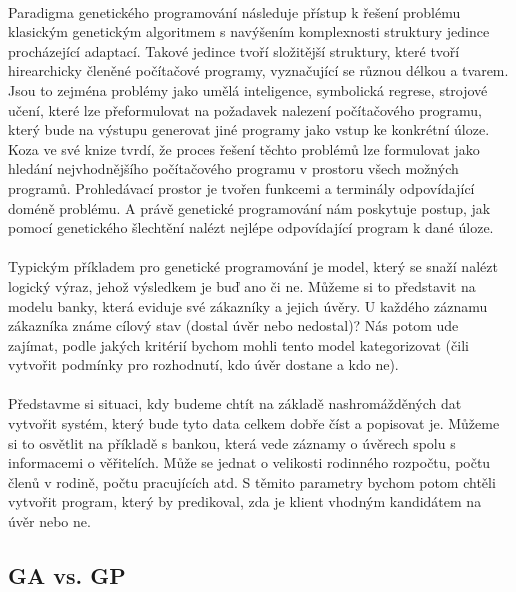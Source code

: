 \documentclass[bc,male,java,dept460]{diploma}		%
\begin{document}
\paragraph*{}
Paradigma genetického programování následuje přístup k řešení problému klasickým genetickým algoritmem s navýšením komplexnosti struktury jedince procházející adaptací. Takové jedince tvoří složitější struktury, které tvoří hirearchicky členěné počítačové programy, vyznačující se různou délkou a tvarem. Jsou to zejména problémy jako umělá inteligence, symbolická regrese, strojové učení, které lze přeformulovat na požadavek nalezení počítačového programu, který bude na výstupu generovat jiné programy jako vstup ke konkrétní úloze. Koza ve své knize tvrdí, že proces řešení těchto problémů lze formulovat jako hledání nejvhodnějšího počítačového programu v prostoru všech možných programů. Prohledávací prostor je tvořen funkcemi a terminály odpovídající doméně problému. A právě genetické programování nám poskytuje postup, jak pomocí genetického šlechtění nalézt nejlépe odpovídající program k dané úloze.

\paragraph*{}
Typickým příkladem pro genetické programování je model, který se snaží nalézt logický výraz, jehož výsledkem je buď ano či ne. Můžeme si to představit na modelu banky, která eviduje své zákazníky a jejich úvěry. U každého záznamu zákazníka známe cílový stav (dostal úvěr nebo nedostal)? Nás potom ude zajímat, podle jakých kritérií bychom mohli tento model kategorizovat (čili vytvořit podmínky pro rozhodnutí, kdo úvěr dostane a kdo ne).

\paragraph*{}
Představme si situaci, kdy budeme chtít na základě nashromážděných dat vytvořit systém, který bude tyto data celkem dobře číst a popisovat je. Můžeme si to osvětlit na příkladě s bankou, která vede záznamy o úvěrech spolu s informacemi o věřitelích. Může se jednat o velikosti rodinného rozpočtu, počtu členů v rodině, počtu pracujících atd. S těmito parametry bychom potom chtěli vytvořit program, který by predikoval, zda je klient vhodným kandidátem na úvěr nebo ne.

\subsection{GA vs. GP}
\end{document}

